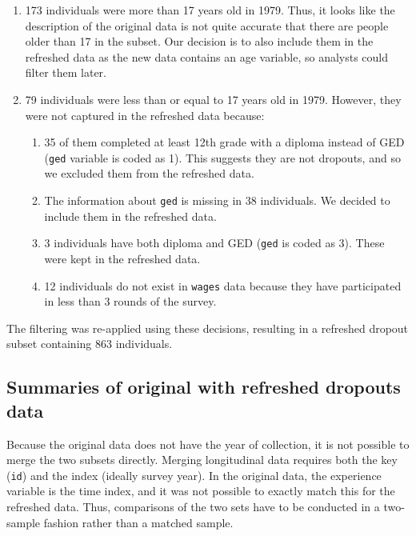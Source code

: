 \documentclass{article}
\providecommand{\tightlist}{%
  \setlength{\itemsep}{0pt}\setlength{\parskip}{0pt}}
\begin{document}
\begin{enumerate}
\def\labelenumi{\arabic{enumi}.}
\tightlist
\item
  173 individuals were more than 17 years old in 1979. Thus, it looks like the description of the original data is not quite accurate that there are people older than 17 in the subset. Our decision is to also include them in the refreshed data as the new data contains an age variable, so analysts could filter them later.
\item
  79 individuals were less than or equal to 17 years old in 1979. However, they were not captured in the refreshed data because:

  \begin{enumerate}
  \def\labelenumii{\roman{enumii}.}
  \tightlist
  \item
    35 of them completed at least 12th grade with a diploma instead of GED (\texttt{ged} variable is coded as 1). This suggests they are not dropouts, and so we excluded them from the refreshed data.
  \item
    The information about \texttt{ged} is missing in 38 individuals. We decided to include them in the refreshed data.
  \item
    3 individuals have both diploma and GED (\texttt{ged} is coded as 3). These were kept in the refreshed data.
  \item
    12 individuals do not exist in \texttt{wages} data because they have participated in less than 3 rounds of the survey.
  \end{enumerate}
\end{enumerate}

The filtering was re-applied using these decisions, resulting in a refreshed dropout subset containing 863 individuals.

\hypertarget{summaries-of-original-with-refreshed-dropouts-data}{%
\subsection{Summaries of original with refreshed dropouts data}\label{summaries-of-original-with-refreshed-dropouts-data}}

Because the original data does not have the year of collection, it is not possible to merge the two subsets directly. Merging longitudinal data requires both the key (\texttt{id}) and the index (ideally survey year). In the original data, the experience variable is the time index, and it was not possible to exactly match this for the refreshed data. Thus, comparisons of the two sets have to be conducted in a two-sample fashion rather than a matched sample.
\end{document}
